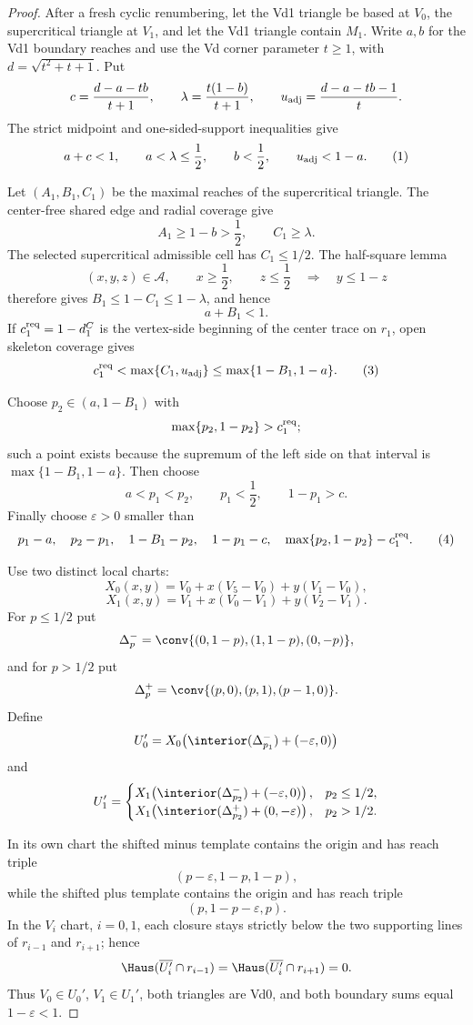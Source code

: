 \begin{proof}
After a fresh cyclic renumbering, let the Vd1 triangle be based at $V_0$, the
supercritical triangle at $V_1$, and let the Vd1 triangle contain $M_1$. Write $a,b$
for the Vd1 boundary reaches and use the Vd corner parameter $t\ge1$, with
$d=\sqrt{t^2+t+1}$. Put
\[
 c=\frac{d-a-tb}{t+1},\qquad
 \lambda=\frac{t(1-b)}{t+1},\qquad
 u_{\rm adj}=\frac{d-a-tb-1}{t}.
\]
The strict midpoint and one-sided-support inequalities give
\[
 a+c<1,\qquad a<\lambda\le\frac12,
 \qquad b<\frac12,
 \qquad u_{\rm adj}<1-a.
\tag{1}
\]

Let $(A_1,B_1,C_1)$ be the maximal reaches of the supercritical triangle. The
center-free shared edge and radial coverage give
\[
 A_1\ge1-b>\frac12,
 \qquad C_1\ge\lambda.
\]
The selected supercritical admissible cell has $C_1\le1/2$. The half-square
lemma
\[
 (x,y,z)\in\mathcal A,\qquad x\ge\frac12,\qquad z\le\frac12
 \quad\Longrightarrow\quad y\le1-z
\]
therefore gives $B_1\le1-C_1\le1-\lambda$, and hence
\[
 a+B_1<1.
\tag{2}
\]
If $c_1^{\rm req}=1-d_1^C$ is the vertex-side beginning of the center trace
on $r_1$, open skeleton coverage gives
\[
 c_1^{\rm req}<\max\{C_1,u_{\rm adj}\}
 \le\max\{1-B_1,1-a\}.
\tag{3}
\]

Choose $p_2\in(a,1-B_1)$ with
\[
 \max\{p_2,1-p_2\}>c_1^{\rm req};
\]
such a point exists because the supremum of the left side on that interval is
$\max\{1-B_1,1-a\}$. Then choose
\[
 a<p_1<p_2,
 \qquad p_1<\frac12,
 \qquad1-p_1>c.
\]
Finally choose $\varepsilon>0$ smaller than
\[
 p_1-a,\quad p_2-p_1,\quad1-B_1-p_2,\quad1-p_1-c,
 \quad\max\{p_2,1-p_2\}-c_1^{\rm req}.
\tag{4}
\]

Use two distinct local charts:
\[
 X_0(x,y)=V_0+x(V_5-V_0)+y(V_1-V_0),
\]
\[
 X_1(x,y)=V_1+x(V_0-V_1)+y(V_2-V_1).
\]
For $p\le1/2$ put
\[
 \Delta_p^-=\conv\{(0,1-p),(1,1-p),(0,-p)\},
\]
and for $p>1/2$ put
\[
 \Delta_p^+=\conv\{(p,0),(p,1),(p-1,0)\}.
\]
Define
\[
 U_0'=X_0\!\left(\interior(\Delta_{p_1}^-)+(-\varepsilon,0)\right)
\]
and
\[
 U_1'=\begin{cases}
 X_1\!\left(\interior(\Delta_{p_2}^-)+(-\varepsilon,0)\right),
   &p_2\le1/2,\\
 X_1\!\left(\interior(\Delta_{p_2}^+)+(0,-\varepsilon)\right),
   &p_2>1/2.
 \end{cases}
\]

In its own chart the shifted minus template contains the origin and has reach
triple
\[
 (p-\varepsilon,1-p,1-p),
\]
while the shifted plus template contains the origin and has reach triple
\[
 (p,1-p-\varepsilon,p).
\]
In the $V_i$ chart, $i=0,1$, each closure stays strictly below the two
supporting lines of $r_{i-1}$ and $r_{i+1}$; hence
\[
 \Haus(\overline{U_i'}\cap r_{i-1})
 =\Haus(\overline{U_i'}\cap r_{i+1})=0.
\]
Thus $V_0\in U_0'$, $V_1\in U_1'$, both triangles are Vd0, and both boundary
sums equal $1-\varepsilon<1$.


\end{proof}
